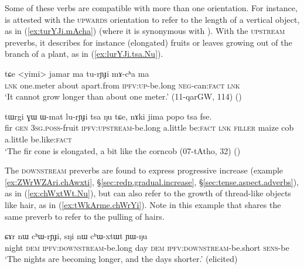 Some of these verbs are compatible with more than one orientation. For instance,  is attested with the \textsc{upwards} orientation to refer to the length of a vertical object, as in (\ref{ex:turYJi.mAcha}) (where it is synonymous with ). With the \textsc{upstream} preverbs, it describes for instance (elongated) fruits or leaves growing out of the branch of a plant, as in (\ref{ex:lurYJi.tsa.Nu}).
 
\begin{exe}
\ex \label{ex:turYJi.mAcha}
\gll tɕe <yimi> jamar ma tu-rɲɟi mɤ-cʰa ma  \\
\textsc{lnk} one.meter about apart.from \textsc{ipfv}:\textsc{up}-be.long \textsc{neg}-can:\textsc{fact} \textsc{lnk} \\
\glt `It cannot grow longer than about one meter.' (11-qarGW, 114)
()
\end{exe}

\begin{exe}
\ex \label{ex:lurYJi.tsa.Nu}
\gll tɯrgi ɣɯ ɯ-mat lu-rɲɟi tsa ŋu tɕe, nɤki jima popo tsa fse. \\
fir \textsc{gen}  \textsc{3sg}.\textsc{poss}-fruit \textsc{ipfv}:\textsc{upstream}-be.long a.little be:\textsc{fact} \textsc{lnk} \textsc{filler} maize cob a.little be.like:\textsc{fact} \\
\glt  `The fir cone is elongated, a bit like the corncob (07-tAtho, 32)
()
\end{exe}

The \textsc{downstream} preverbs are found to express progressive increase (example \ref{ex:ZWrWZAri.chAwxti}, §\ref{sec:redp.gradual.increase}, §\ref{sec:tense.aspect.adverbs}), as in (\ref{ex:chWxtWt.Nu}), but can also refer to the growth of thread-like objects like hair, as in (\ref{ex:tWkArme.chWrYi}). Note in this example that  shares the same preverb to refer to the pulling of hairs.
 
\begin{exe}
\ex \label{ex:chWxtWt.Nu}
\gll ɕɤr nɯ cʰɯ-rɲɟi, sŋi nɯ cʰɯ-xtɯt ɲɯ-ŋu \\
night \textsc{dem} \textsc{ipfv}:\textsc{downstream}-be.long day \textsc{dem}  \textsc{ipfv}:\textsc{downstream}-be.short \textsc{sens}-be \\
\glt `The nights are becoming longer, and the days shorter.' (elicited)
\end{exe}

